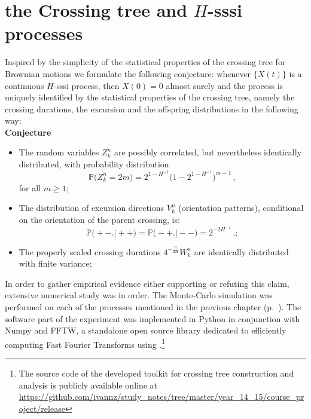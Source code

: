\documentclass[a4paper]{article}
\newcommand{\pr}{\mathbb{P}}
\newcommand{\Dcal}{\mathcal{D}}
\begin{document}

\section{the Crossing tree and $H$-sssi processes} %
\label{sec:experiment_setup}

Inspired by the simplicity of the statistical properties of the crossing tree for
Brownian motions we formulate the following conjecture: whenever $\{X(t)\}$ is a
continuous $H$-sssi process, then $X(0)= 0$ almost surely and the process is uniquely
identified by the statistical properties of the crossing tree, namely the crossing
durations, the excursion and the offspring distributions in the following way:\\
\noindent \textbf{Conjecture}\begin{itemize}
    \item The random variables $Z_k^n$ are possibly correlated, but nevertheless
    identically distributed, with probability distribution
    \[ \pr\bigl(Z_k^n=2m\bigr) = 2^{1-H^{-1}}\bigl(1-2^{1-H^{-1}}\bigr)^{m-1} \,,\]
    for all $m\geq 1$;
    \item The distribution of excursion directions $V_k^n$ (orientation patterns),
    conditional on the orientation of the parent crossing, is:
    \[ \pr\bigl( +- \bigr.\bigl\lvert ++ \bigr)
	= \pr\bigl( -+ \bigr.\bigl\lvert -- \bigr)
	= 2^{-2H^{-1}} \,.; \]
	\item The properly scaled crossing durations $4^{-\frac{n}{2H}} W_k^n$
	are identically distributed with finite variance;
\end{itemize}

In order to gather empirical evidence either supporting or refuting this claim,
extensive numerical study was in order. The Monte-Carlo simulation was performed
on each of the processes mentioned in the previous chapter (p.~\pageref{sec:h_sssi_processes}).
The software part of the experiment was implemented in Python in conjunction with
Numpy and FFTW, a standalone open source library dedicated to efficiently computing
Fast Fourier Transforms using .\footnote{The source code of the developed toolkit for crossing tree
construction and analysis is publicly available online at
\url{https://github.com/ivannz/study_notes/tree/master/year_14_15/course_project/release}}
\end{document}
